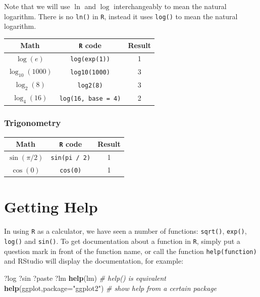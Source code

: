 \documentclass[]{book}
\newenvironment{Shaded}{\begin{snugshade}}{\end{snugshade}}
\newcommand{\CommentTok}[1]{\textcolor[rgb]{0.56,0.35,0.01}{\textit{#1}}}
\newcommand{\DataTypeTok}[1]{\textcolor[rgb]{0.13,0.29,0.53}{#1}}
\newcommand{\KeywordTok}[1]{\textcolor[rgb]{0.13,0.29,0.53}{\textbf{#1}}}
\newcommand{\NormalTok}[1]{#1}
\newcommand{\StringTok}[1]{\textcolor[rgb]{0.31,0.60,0.02}{#1}}
\begin{document}
Note that we will use \(\ln\) and \(\log\) interchangeably to mean the natural logarithm. There is no \texttt{ln()} in \texttt{R}, instead it uses \texttt{log()} to mean the natural logarithm.

\begin{longtable}[]{@{}ccc@{}}
\toprule
Math & \texttt{R} code & Result\tabularnewline
\midrule
\endhead
\(\log(e)\) & \texttt{log(exp(1))} & 1\tabularnewline
\(\log_{10}(1000)\) & \texttt{log10(1000)} & 3\tabularnewline
\(\log_{2}(8)\) & \texttt{log2(8)} & 3\tabularnewline
\(\log_{4}(16)\) & \texttt{log(16,\ base\ =\ 4)} & 2\tabularnewline
\bottomrule
\end{longtable}

\hypertarget{trigonometry}{%
\subsubsection*{Trigonometry}\label{trigonometry}}

\begin{longtable}[]{@{}ccc@{}}
\toprule
Math & \texttt{R} code & Result\tabularnewline
\midrule
\endhead
\(\sin(\pi / 2)\) & \texttt{sin(pi\ /\ 2)} & 1\tabularnewline
\(\cos(0)\) & \texttt{cos(0)} & 1\tabularnewline
\bottomrule
\end{longtable}

\hypertarget{getting-help}{%
\section{Getting Help}\label{getting-help}}

In using \texttt{R} as a calculator, we have seen a number of functions: \texttt{sqrt()}, \texttt{exp()}, \texttt{log()} and \texttt{sin()}. To get documentation about a function in \texttt{R}, simply put a question mark in front of the function name, or call the function \texttt{help(function)} and RStudio will display the documentation, for example:

\begin{Shaded}
\begin{Highlighting}[]
\NormalTok{?log}
\NormalTok{?sin}
\NormalTok{?paste}
\NormalTok{?lm}
\KeywordTok{help}\NormalTok{(lm)   }\CommentTok{# help() is equivalent}
\KeywordTok{help}\NormalTok{(ggplot,}\DataTypeTok{package=}\StringTok{"ggplot2"}\NormalTok{)  }\CommentTok{# show help from a certain package}
\end{Highlighting}
\end{Shaded}
\end{document}
